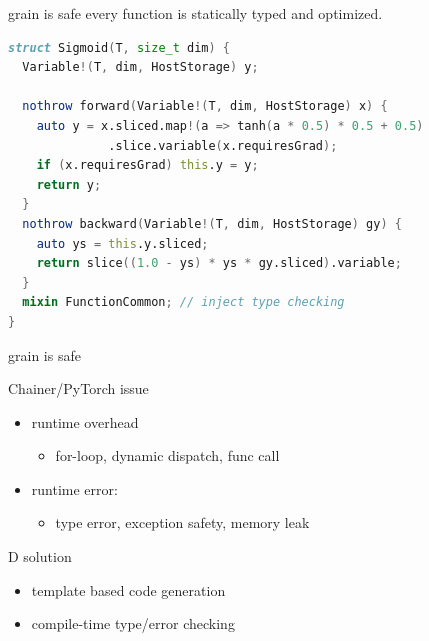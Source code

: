 \documentclass[aspectratio=169,
  14pt,xcolor=dvipsnames,table,professional font,dvipdfmx]{beamer}
\begin{document}
\begin{frame}[fragile]{grain is \alert{safe}}
  every function is statically typed and optimized.
  \begin{lstlisting}[language=D,basicstyle=\footnotesize\ttfamily]
struct Sigmoid(T, size_t dim) {
  Variable!(T, dim, HostStorage) y;

  nothrow forward(Variable!(T, dim, HostStorage) x) {
    auto y = x.sliced.map!(a => tanh(a * 0.5) * 0.5 + 0.5)
              .slice.variable(x.requiresGrad);
    if (x.requiresGrad) this.y = y;
    return y;
  }
  nothrow backward(Variable!(T, dim, HostStorage) gy) {
    auto ys = this.y.sliced;
    return slice((1.0 - ys) * ys * gy.sliced).variable;
  }
  mixin FunctionCommon; // inject type checking
}\end{lstlisting}
\end{frame}

\begin{frame}{grain is \alert{safe}}
  \begin{alertblock}{Chainer/PyTorch issue}
  \begin{itemize}
  \item runtime overhead
    \begin{itemize}
    \item for-loop, dynamic dispatch, func call
    \end{itemize}
  \item runtime error:
    \begin{itemize}
    \item type error, exception safety, memory leak
    \end{itemize}
  \end{itemize}
  \end{alertblock}
  \begin{exampleblock}{D solution}
    \begin{itemize}
    \item template based code generation
    \item compile-time type/error checking
    \end{itemize}
  \end{exampleblock}
\end{frame}
\end{document}
